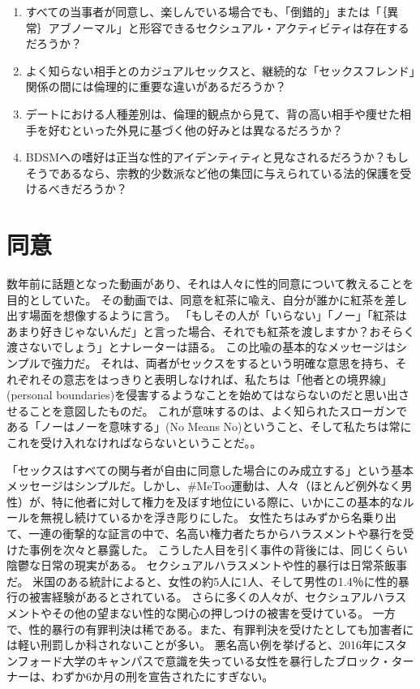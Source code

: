 \documentclass[paper=a4,book,openany]{jlreq}
\begin{document}
\begin{enumerate}
    \item すべての当事者が同意し、楽しんでいる場合でも、「倒錯的」または「｛異常｝{アブノーマル}」と形容できるセクシュアル・アクティビティは存在するだろうか？
    \item よく知らない相手とのカジュアルセックスと、継続的な「セックスフレンド」関係の間には倫理的に重要な違いがあるだろうか？
    \item デートにおける人種差別は、倫理的観点から見て、背の高い相手や痩せた相手を好むといった外見に基づく他の好みとは異なるだろうか？
    \item BDSMへの嗜好は正当な性的アイデンティティと見なされるだろうか？もしそうであるなら、宗教的少数派など他の集団に与えられている法的保護を受けるべきだろうか？
\end{enumerate}

\chapter{同意}

数年前に話題となった動画があり、それは人々に性的同意について教えることを目的としていた。
その動画では、同意を紅茶に喩え、自分が誰かに紅茶を差し出す場面を想像するように言う。
「もしその人が「いらない」「ノー」「紅茶はあまり好きじゃないんだ」と言った場合、それでも紅茶を渡しますか？おそらく渡さないでしょう」とナレーターは語る。
この比喩の基本的なメッセージはシンプルで強力だ。
それは、両者がセックスをするという明確な意思を持ち、それぞれその意志をはっきりと表明しなければ、私たちは「他者との境界線」(personal boundaries)を侵害するようなことを始めてはならないのだと思い出させることを意図したものだ。
これが意味するのは、よく知られたスローガンである「ノーはノーを意味する」(No Means No)ということ、そして私たちは常にこれを受け入れなければならないということだ。\citep{may15:_consen}。

「セックスはすべての関与者が自由に同意した場合にのみ成立する」という基本メッセージはシンプルだ。しかし、\#MeToo運動は、人々（ほとんど例外なく男性）が、特に他者に対して権力を及ぼす地位にいる際に、いかにこの基本的なルールを無視し続けているかを浮き彫りにした。
女性たちはみずから名乗り出て、一連の衝撃的な証言の中で、名高い権力者たちからハラスメントや暴行を受けた事例を次々と暴露した。
こうした人目を引く事件の背後には、同じくらい陰鬱な日常の現実がある。
セクシュアルハラスメントや性的暴行は日常茶飯事だ。
米国のある統計によると、女性の約5人に1人、そして男性の1.4％に性的暴行の被害経験があるとされている\citep{black11:_nation_intim_partn_sexual_violen_survey}。
さらに多くの人々が、セクシュアルハラスメントやその他の望まない性的な関心の押しつけの被害を受けている。
一方で、性的暴行の有罪判決は稀である。また、有罪判決を受けたとしても加害者には軽い刑罰しか科されないことが多い。
悪名高い例を挙げると、2016年にスタンフォード大学のキャンパスで意識を失っている女性を暴行したブロック・ターナーは、わずか6か月の刑を宣告されたにすぎない\citep{stack16:_light_senten_brock}。
\end{document}
